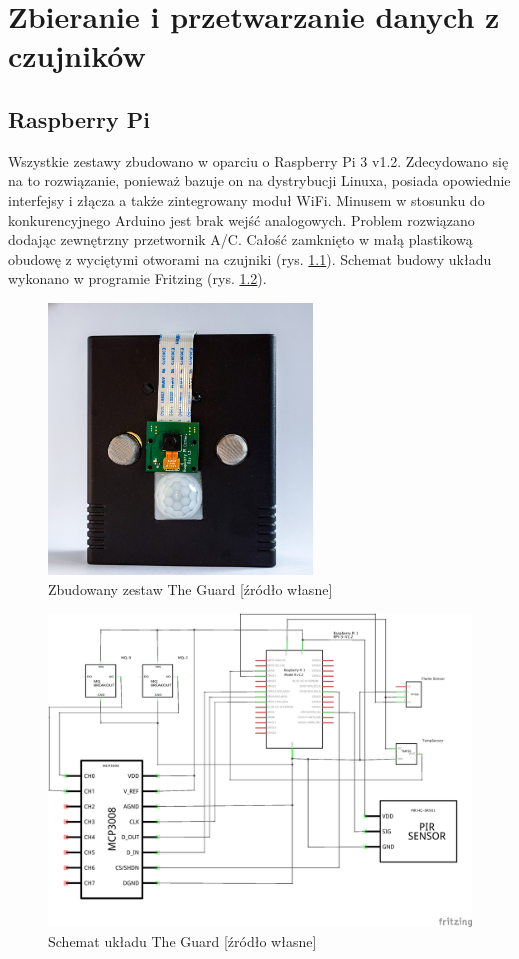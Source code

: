 \chapter{Zbieranie i przetwarzanie danych z czujników}
\section{Raspberry Pi}
Wszystkie zestawy zbudowano w oparciu o Raspberry Pi 3 v1.2. Zdecydowano się na to rozwiązanie, ponieważ bazuje on na dystrybucji Linuxa, posiada opowiednie interfejsy i złącza a także zintegrowany moduł WiFi. Minusem w stosunku do konkurencyjnego Arduino jest brak wejść analogowych. Problem rozwiązano dodając zewnętrzny przetwornik A/C. Całość zamknięto w małą plastikową obudowę z wyciętymi otworami na czujniki (rys. \ref{the_guard_set}). Schemat budowy układu wykonano w programie Fritzing (rys. \ref{the_guard_schem}).
\begin{figure}[h]
	\centering
	\includegraphics[width=7cm]{guard.jpg}
	\caption{Zbudowany zestaw The Guard [źródło własne]}
	\label{the_guard_set}
\end{figure}
\begin{figure}[h]
	\centering
	\includegraphics[width=15cm]{GuardSchem}
	\caption{Schemat układu The Guard [źródło własne]}
	\label{the_guard_schem}
\end{figure}
